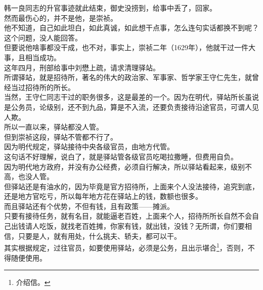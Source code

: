 \begin{multicols}{\theparacolNo}
韩一良同志的升官事迹就此结束，御史没捞到，给事中丢了，回家。\\

然而最伤心的，并不是他，是崇祯。\\

他不知道，自己如此坦白，如此真诚，如此想干点事，怎么连句实话都换不到呢？\\

这个问题，没人能回答。\\

但要说他啥事都没干成，也不对，事实上，崇祯二年（1629年），他就干过一件大事，且相当成功。\\

这年四月，刑部给事中刘懋上疏，请求清理驿站。\\

所谓驿站，就是招待所，著名的伟大的政治家、军事家、哲学家王守仁先生，就曾经当过招待所的所长。\\

当然，王守仁同志干过的职务很多，这是最差的一个。因为在明代，驿站所长虽说是公务员，论级别，还不到九品，算是不入流，还要负责接待沿途官员，可谓人见人欺。\\

所以一直以来，驿站都没人管。\\

但到崇祯这段，驿站不管都不行了。\\

因为明代规定，驿站接待中央各级官员，由地方代管。\\

这句话不好理解，说白了，就是驿站管各级官员吃喝拉撒睡，但费用自负。\\

因为明代地方政府，并没有办公经费，必须自行解决，所以驿站看起来，级别不高，也没人管。\\

但驿站还是有油水的，因为毕竟是官方招待所，上面来个人没法接待，追究到底，还是地方官吃亏，所以每年地方花在驿站上的钱，数额也很多。\\

而且驿站还有个优势，不但有钱，且有政策——摊派。\\

只要有接待任务，就有名目，就能逼老百姓，上面来个人，招待所所长自然不会自己出钱请人吃饭，就找老百姓摊，你家有钱，就出钱，没钱？无所谓，你们要相信，只要是人，就有用处，什么挑夫、轿夫，都可以干。\\

其实根据规定，过往官员，如要使用驿站，必须是公务，且出示堪合\footnote{介绍信。}，否则，不得随便使用。\\


\end{multicols}
